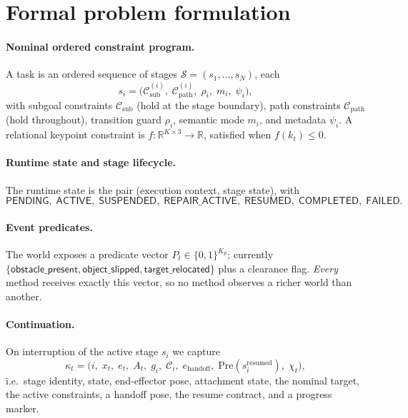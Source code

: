 \documentclass[11pt]{article}
\begin{document}
\section{Formal problem formulation}

\paragraph{Nominal ordered constraint program.}
A task is an ordered sequence of stages
$\mathcal S=(s_1,\dots,s_N)$, each
\begin{equation}
s_i=\bigl(\mathcal C^{(i)}_{\mathrm{sub}},\;
          \mathcal C^{(i)}_{\mathrm{path}},\;
          \rho_i,\; m_i,\; \psi_i\bigr),
\end{equation}
with subgoal constraints $\mathcal C_{\mathrm{sub}}$ (hold at the stage
boundary), path constraints $\mathcal C_{\mathrm{path}}$ (hold throughout),
transition guard $\rho_i$, semantic mode $m_i$, and metadata $\psi_i$. A
relational keypoint constraint is $f:\mathbb R^{K\times3}\to\mathbb R$,
satisfied when $f(k_t)\le0$.

\paragraph{Runtime state and stage lifecycle.}
The runtime state is the pair (execution context, stage state), with
\[
\textsf{PENDING},\;\textsf{ACTIVE},\;\textsf{SUSPENDED},\;
\textsf{REPAIR\_ACTIVE},\;\textsf{RESUMED},\;\textsf{COMPLETED},\;\textsf{FAILED}.
\]

\paragraph{Event predicates.}
The world exposes a predicate vector
$P_t \in\{0,1\}^{K_p}$; currently
$\{\textsf{obstacle\_present},\textsf{object\_slipped},\textsf{target\_relocated}\}$
plus a clearance flag. \emph{Every} method receives exactly this vector, so no
method observes a richer world than another.

\paragraph{Continuation.}
On interruption of the active stage $s_i$ we capture
\begin{equation}
\kappa_t=\bigl(i,\;x_t,\;e_t,\;A_t,\;g_i,\;\mathcal C_i,\;
e_{\mathrm{handoff}},\;\mathrm{Pre}(s_i^{\mathrm{resumed}}),\;\chi_t\bigr),
\end{equation}
i.e.\ stage identity, state, end-effector pose, attachment state, the nominal
target, the active constraints, a handoff pose, the resume contract, and a
progress marker.
\end{document}
